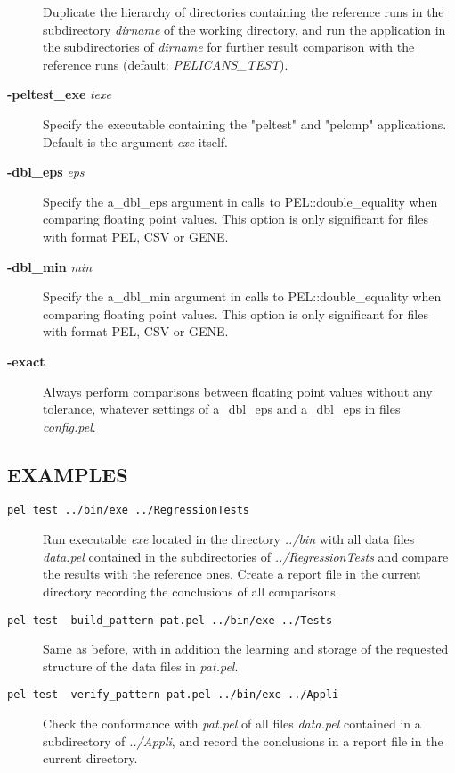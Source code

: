 \documentclass{article}
\begin{document}
\begin{description}
Duplicate the hierarchy of directories containing the reference runs
in the subdirectory \emph{dirname} of the working directory,
and run the application in the subdirectories of \emph{dirname} for further
result comparison with the reference runs (default: \emph{PELICANS\_TEST}).


\item[\textbf{-peltest\_exe} \emph{texe}] \mbox{}

Specify the executable containing the "peltest" and "pelcmp" applications.
Default is the argument \emph{exe} itself.


\item[\textbf{-dbl\_eps} \emph{eps}] \mbox{}

Specify the a\_dbl\_eps argument in calls to PEL::double\_equality
when comparing floating point values. This option is only
significant for files with format PEL, CSV or GENE.


\item[\textbf{-dbl\_min} \emph{min}] \mbox{}

Specify the a\_dbl\_min argument in calls to PEL::double\_equality
when comparing floating point values. This option is only
significant for files with format PEL, CSV or GENE.


\item[\textbf{-exact}] \mbox{}

Always perform comparisons between floating point values
without any tolerance, whatever settings of a\_dbl\_eps
and a\_dbl\_eps in files \emph{config.pel}.

\end{description}
\subsection*{EXAMPLES\label{test_EXAMPLES}}
\begin{description}

\item[\texttt{pel test ../bin/exe ../RegressionTests}] \mbox{}

Run executable \emph{exe} located in the directory \emph{../bin}
with all data files \emph{data.pel} contained in the subdirectories
of \emph{../RegressionTests} and compare the results with the reference ones.
Create a report file in the current directory recording the conclusions
of all comparisons.


\item[\texttt{pel test -build\_pattern pat.pel ../bin/exe ../Tests}] \mbox{}

Same as before, with in addition the learning and storage of the requested
structure of the data files in \emph{pat.pel}.


\item[\texttt{pel test -verify\_pattern pat.pel ../bin/exe ../Appli}] \mbox{}

Check the conformance with \emph{pat.pel} of all files \emph{data.pel} contained 
in a subdirectory of \emph{../Appli}, and record the conclusions in a report 
file in the current directory.

\end{description}
\clearpage
\end{document}
